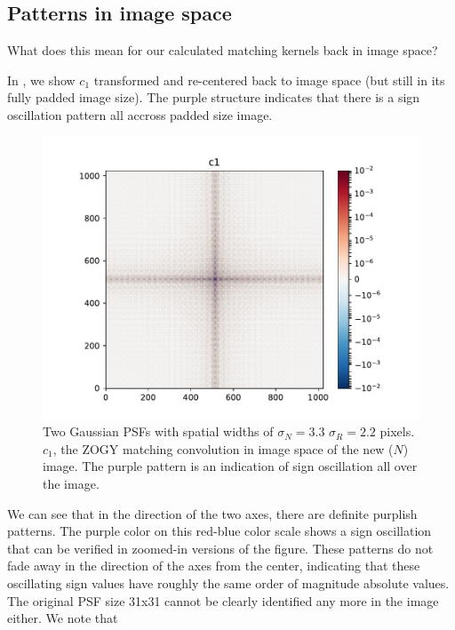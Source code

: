 \subsection{Patterns in image space\label{sec:patterns}}
\par What does this mean for our calculated matching kernels back in
image space?
%
\par In , we show \(c_1\) transformed and
re-centered back to image space (but still in its fully padded image
size). The purple structure indicates that there is a sign oscillation
pattern all accross padded size image.
\begin{figure}
\begin{center}
\includegraphics[width=5.5in]{fig/twoG_defaults_c1.pdf}
\end{center}
\caption{\label{fig:twoG_c1}Two Gaussian PSFs with spatial widths of \(\sigma_N = 3.3\)
  \(\sigma_R = 2.2\) pixels. \(c_1\), the ZOGY matching convolution in image space
  of the new (\(N\)) image. The purple pattern is an indication of
  sign oscillation all over the image.}
\end{figure}
%
\par We can see that in the direction of the two axes, there are definite
purplish patterns. The purple color on this red-blue color scale shows a
sign oscillation that can be verified in zoomed-in versions of the
figure. These patterns do not fade away in the direction of the axes from
the center, indicating that these oscillating sign values have roughly the
same order of magnitude absolute values. The original PSF size 31x31 cannot
be clearly identified any more in the image either. We note that

